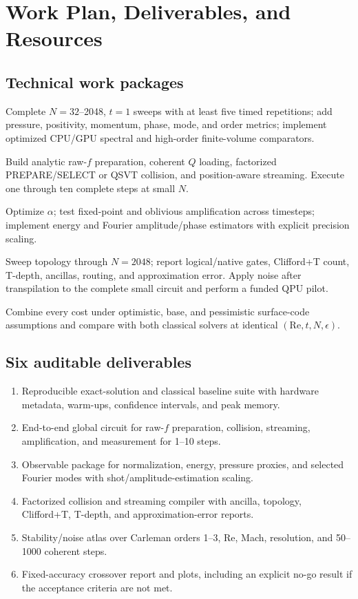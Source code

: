 \documentclass[10pt,twocolumn]{article}
\newcommand{\Rey}{\mathrm{Re}}
\begin{document}
\section{Work Plan, Deliverables, and Resources}
\subsection{Technical work packages}
\begin{description}[leftmargin=8mm,labelindent=0mm,style=nextline,itemsep=2pt]
\item[WP1---Physics and baselines.] Complete $N=32$--2048, $t=1$ sweeps with
at least five timed repetitions; add pressure, positivity, momentum, phase,
mode, and order metrics; implement optimized CPU/GPU spectral and high-order
finite-volume comparators.
\item[WP2---Integrated quantum timestep.] Build analytic raw-$f$ preparation,
coherent $Q$ loading, factorized PREPARE/SELECT or QSVT collision, and
position-aware streaming. Execute one through ten complete steps at small $N$.
\item[WP3---Success and observables.] Optimize $\alpha$; test fixed-point and
oblivious amplification across timesteps; implement energy and Fourier
amplitude/phase estimators with explicit precision scaling.
\item[WP4---Compilation and reliability.] Sweep topology through $N=2048$;
report logical/native gates, Clifford+T count, T-depth, ancillas, routing, and
approximation error. Apply noise after transpilation to the complete small
circuit and perform a funded QPU pilot.
\item[WP5---Crossover decision.] Combine every cost under optimistic, base,
and pessimistic surface-code assumptions and compare with both classical
solvers at identical $(\Rey,t,N,\epsilon)$.
\end{description}

\subsection{Six auditable deliverables}
\begin{enumerate}
\item Reproducible exact-solution and classical baseline suite with hardware
metadata, warm-ups, confidence intervals, and peak memory.
\item End-to-end global circuit for raw-$f$ preparation, collision, streaming,
amplification, and measurement for 1--10 steps.
\item Observable package for normalization, energy, pressure proxies, and
selected Fourier modes with shot/amplitude-estimation scaling.
\item Factorized collision and streaming compiler with ancilla, topology,
Clifford+T, T-depth, and approximation-error reports.
\item Stability/noise atlas over Carleman orders 1--3, $\Rey$, Mach, resolution,
and 50--1000 coherent steps.
\item Fixed-accuracy crossover report and plots, including an explicit no-go
result if the acceptance criteria are not met.
\end{enumerate}
\end{document}
